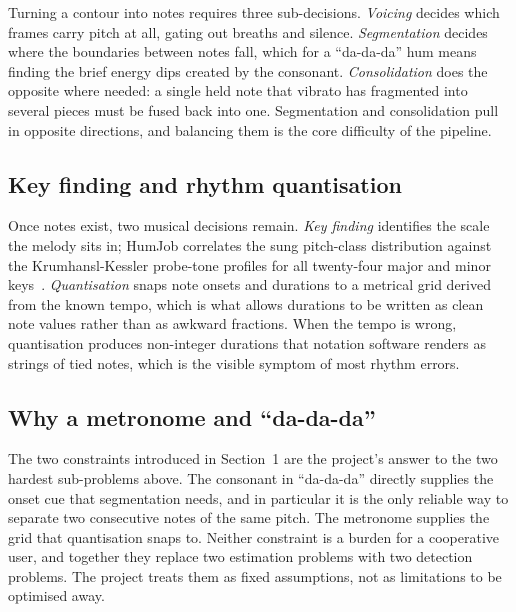 \documentclass[12pt,a4paper]{article}
\begin{document}
Turning a contour into notes requires three sub-decisions. \emph{Voicing}
decides which frames carry pitch at all, gating out breaths and silence.
\emph{Segmentation} decides where the boundaries between notes fall, which for
a ``da-da-da'' hum means finding the brief energy dips created by the
consonant. \emph{Consolidation} does the opposite where needed: a single held
note that vibrato has fragmented into several pieces must be fused back into
one. Segmentation and consolidation pull in opposite directions, and balancing
them is the core difficulty of the pipeline.

\subsection{Key finding and rhythm quantisation}

Once notes exist, two musical decisions remain. \emph{Key finding} identifies
the scale the melody sits in; HumJob correlates the sung pitch-class
distribution against the Krumhansl-Kessler probe-tone profiles for all
twenty-four major and minor keys~\cite{krumhansl}. \emph{Quantisation} snaps
note onsets and durations to a metrical grid derived from the known tempo,
which is what allows durations to be written as clean note values rather than
as awkward fractions. When the tempo is wrong, quantisation produces
non-integer durations that notation software renders as strings of tied notes,
which is the visible symptom of most rhythm errors.

\subsection{Why a metronome and ``da-da-da''}

The two constraints introduced in Section~1 are the project's answer to the two
hardest sub-problems above. The consonant in ``da-da-da'' directly supplies the
onset cue that segmentation needs, and in particular it is the only reliable
way to separate two consecutive notes of the same pitch. The metronome supplies
the grid that quantisation snaps to. Neither constraint is a burden for a
cooperative user, and together they replace two estimation problems with two
detection problems. The project treats them as fixed assumptions, not as
limitations to be optimised away.

\end{document}
